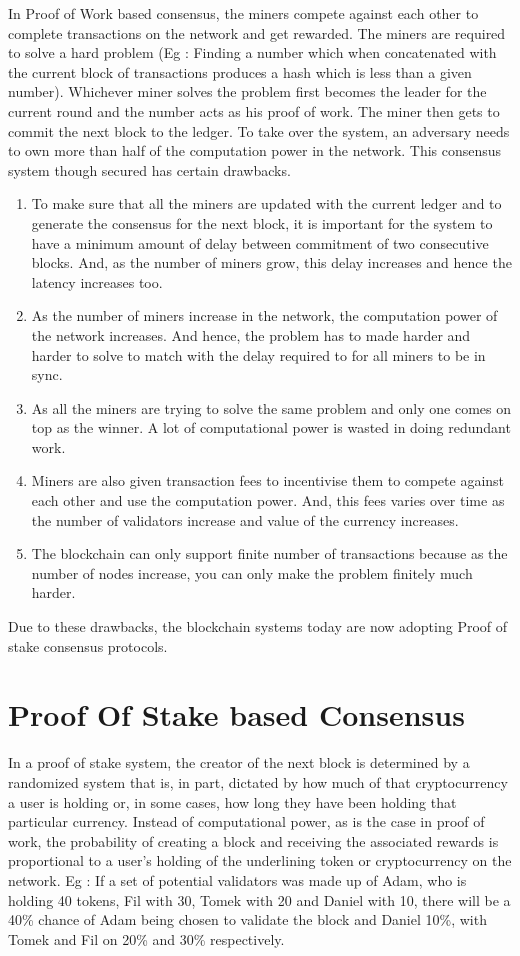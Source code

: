 In Proof of Work based consensus, the miners compete against each other to complete transactions on the network and get rewarded. The miners are required to solve a hard problem (Eg : Finding a number which when concatenated with the current block of transactions produces a hash which is less than a given number). Whichever miner solves the problem first becomes the leader for the current round and the number acts as his proof of work. The miner then gets to commit the next block to the ledger. To take over the system, an adversary needs to own more than half of the computation power in the network. This consensus system though secured has certain drawbacks. 
\begin{enumerate}
  \item To make sure that all the miners are updated with the current ledger and to generate the consensus for the next block, it is important for the system to have a minimum amount of delay between commitment of two consecutive blocks. And, as the number of miners grow, this delay increases and hence the latency increases too.
  \item As the number of miners increase in the network, the computation power of the network increases. And hence, the problem has to made harder and harder to solve to match with the delay required to for all miners to be in sync.
  \item As all the miners are trying to solve the same problem and only one comes on top as the winner. A lot of computational power is wasted in doing redundant work.
  \item Miners are also given transaction fees to incentivise them to compete against each other and use the computation power. And, this fees varies over time as the number of validators increase and value of the currency increases.
  \item The blockchain can only support finite number of transactions because as the number of nodes increase, you can only make the problem finitely much harder.
\end{enumerate}

Due to these drawbacks, the blockchain systems today are now adopting Proof of stake consensus protocols.

\section{Proof Of Stake based Consensus}

In a proof of stake system, the creator of the next block is determined by a randomized system that is, in part, dictated by how much of that cryptocurrency a user is holding or, in some cases, how long they have been holding that particular currency. Instead of computational power, as is the case in proof of work, the probability of creating a block and receiving the associated rewards is proportional to a user’s holding of the underlining token or cryptocurrency on the network. Eg : If a set of potential validators was made up of Adam, who is holding 40 tokens, Fil with 30, Tomek with 20 and Daniel with 10, there will be a 40\% chance of Adam being chosen to validate the block and Daniel 10\%, with Tomek and Fil on 20\% and 30\% respectively.

